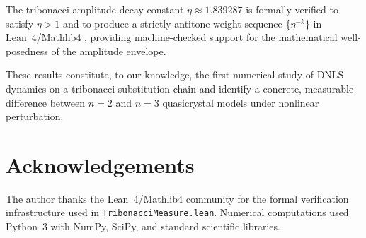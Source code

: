 \documentclass[12pt,a4paper]{article}
\begin{document}
The tribonacci amplitude decay constant $\eta \approx 1.839287$ is formally
verified to satisfy $\eta > 1$ and to produce a strictly antitone weight
sequence $\{\eta^{-k}\}$ in Lean~4/Mathlib4 \cite{AXLE2026}, providing
machine-checked support for the mathematical well-posedness of the amplitude
envelope.

These results constitute, to our knowledge, the first numerical study of
DNLS dynamics on a tribonacci substitution chain and identify a concrete,
measurable difference between $n=2$ and $n=3$ quasicrystal models under
nonlinear perturbation.

\section*{Acknowledgements}

The author thanks the Lean~4/Mathlib4 community for the formal verification
infrastructure used in \texttt{TribonacciMeasure.lean}. Numerical computations
used Python~3 with NumPy, SciPy, and standard scientific libraries.
\end{document}
